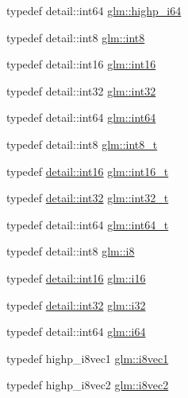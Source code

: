 \begin{DoxyCompactItemize}
\item 
typedef detail\+::int64 \hyperlink{group__gtc__type__precision_gad3cb9a0ac0266ea2c51c6fac256345d1}{glm\+::highp\+\_\+i64}
\item 
typedef detail\+::int8 \hyperlink{group__gtc__type__precision_ga96254f9c1c4506fc8eb5cf3301ce8565}{glm\+::int8}
\item 
typedef detail\+::int16 \hyperlink{group__gtc__type__precision_ga2945a61d12771f8954994fcddf02b021}{glm\+::int16}
\item 
typedef detail\+::int32 \hyperlink{group__gtc__type__precision_ga632d8b25f6b61659f39ea4321fab92a4}{glm\+::int32}
\item 
typedef detail\+::int64 \hyperlink{group__gtc__type__precision_ga435d75819cce297cc5fa21bd84ef89a5}{glm\+::int64}
\item 
typedef detail\+::int8 \hyperlink{group__gtc__type__precision_ga673898d450b2a91186f3c4f40c5f8633}{glm\+::int8\+\_\+t}
\item 
typedef \hyperlink{stb__image_8c_a259fa4834387bd68627ddf37bb3ebdb9}{detail\+::int16} \hyperlink{group__gtc__type__precision_gaf89ee61e0d34aa4a462104b7ae7f2da6}{glm\+::int16\+\_\+t}
\item 
typedef \hyperlink{stb__image_8c_a43d43196463bde49cb067f5c20ab8481}{detail\+::int32} \hyperlink{group__gtc__type__precision_gab870c0eb6f525b0c8c4716762e0fc3a8}{glm\+::int32\+\_\+t}
\item 
typedef detail\+::int64 \hyperlink{group__gtc__type__precision_ga6abb23fbf4e39c50ec5341160b5da5ab}{glm\+::int64\+\_\+t}
\item 
typedef detail\+::int8 \hyperlink{group__gtc__type__precision_gaae064be68b7d36cd7910c16e8ad18bba}{glm\+::i8}
\item 
typedef \hyperlink{stb__image_8c_a259fa4834387bd68627ddf37bb3ebdb9}{detail\+::int16} \hyperlink{group__gtc__type__precision_ga35e5542ca05b29cc256fdafb8503d1fd}{glm\+::i16}
\item 
typedef \hyperlink{stb__image_8c_a43d43196463bde49cb067f5c20ab8481}{detail\+::int32} \hyperlink{group__gtc__type__precision_ga1d8ed5c43e91ea7d4528389da4fa9524}{glm\+::i32}
\item 
typedef detail\+::int64 \hyperlink{group__gtc__type__precision_gac7a7eaad46064fc952b06df33689da23}{glm\+::i64}
\item 
typedef highp\+\_\+i8vec1 \hyperlink{group__gtc__type__precision_ga1cb1ef0f2a9266aba88f161c9062cebc}{glm\+::i8vec1}
\item 
typedef highp\+\_\+i8vec2 \hyperlink{group__gtc__type__precision_ga277312370b6155b37dbf2a6954c42915}{glm\+::i8vec2}

\end{DoxyCompactItemize}
